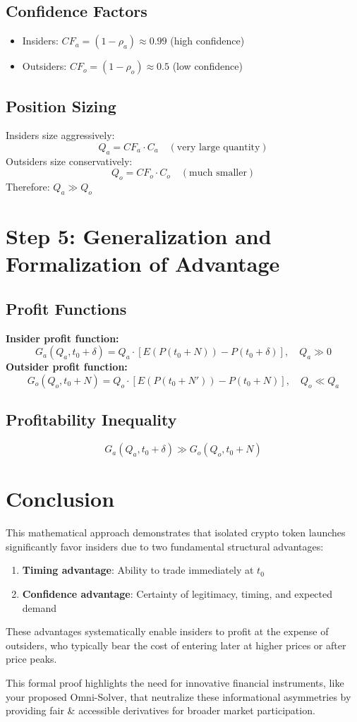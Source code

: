 \documentclass{article}
\begin{document}
\subsection*{Confidence Factors}
\begin{itemize}
    \item Insiders: $CF_a = (1 - \rho_a) \approx 0.99$ (high confidence)
    \item Outsiders: $CF_o = (1 - \rho_o) \approx 0.5$ (low confidence)
\end{itemize}

\subsection*{Position Sizing}

Insiders size aggressively:
\[
Q_a = CF_a \cdot C_a \quad (\text{very large quantity})
\]
Outsiders size conservatively:
\[
Q_o = CF_o \cdot C_o \quad (\text{much smaller})
\]
Therefore: $Q_a \gg Q_o$

\section{Step 5: Generalization and Formalization of Advantage}

\subsection*{Profit Functions}

\textbf{Insider profit function:}
\[
G_a(Q_a, t_0 + \delta) = Q_a \cdot [E(P(t_0 + N)) - P(t_0 + \delta)], \quad Q_a \gg 0
\]
\textbf{Outsider profit function:}
\[
G_o(Q_o, t_0 + N) = Q_o \cdot [E(P(t_0 + N')) - P(t_0 + N)], \quad Q_o \ll Q_a
\]

\subsection*{Profitability Inequality}
\[
G_a(Q_a, t_0 + \delta) \gg G_o(Q_o, t_0 + N)
\]

\section*{Conclusion}

This mathematical approach demonstrates that isolated crypto token launches significantly favor insiders due to two fundamental structural advantages:

\begin{enumerate}
    \item \textbf{Timing advantage}: Ability to trade immediately at $t_0$
    \item \textbf{Confidence advantage}: Certainty of legitimacy, timing, and expected demand
\end{enumerate}

These advantages systematically enable insiders to profit at the expense of outsiders, who typically bear the cost of entering later at higher prices or after price peaks.

This formal proof highlights the need for innovative financial instruments, like your proposed Omni-Solver, that neutralize these informational asymmetries by providing fair & accessible derivatives for broader market participation.
\end{document}
